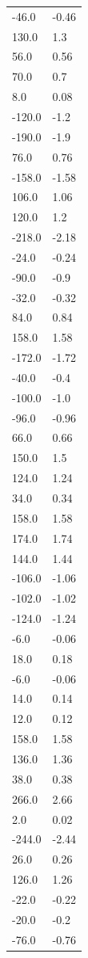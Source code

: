 \begin{longtable}{ll}
-46.0 & -0.46 \\
130.0 & 1.3 \\
56.0 & 0.56 \\
70.0 & 0.7 \\
8.0 & 0.08 \\
-120.0 & -1.2 \\
-190.0 & -1.9 \\
76.0 & 0.76 \\
-158.0 & -1.58 \\
106.0 & 1.06 \\
120.0 & 1.2 \\
-218.0 & -2.18 \\
-24.0 & -0.24 \\
-90.0 & -0.9 \\
-32.0 & -0.32 \\
84.0 & 0.84 \\
158.0 & 1.58 \\
-172.0 & -1.72 \\
-40.0 & -0.4 \\
-100.0 & -1.0 \\
-96.0 & -0.96 \\
66.0 & 0.66 \\
150.0 & 1.5 \\
124.0 & 1.24 \\
34.0 & 0.34 \\
158.0 & 1.58 \\
174.0 & 1.74 \\
144.0 & 1.44 \\
-106.0 & -1.06 \\
-102.0 & -1.02 \\
-124.0 & -1.24 \\
-6.0 & -0.06 \\
18.0 & 0.18 \\
-6.0 & -0.06 \\
14.0 & 0.14 \\
12.0 & 0.12 \\
158.0 & 1.58 \\
136.0 & 1.36 \\
38.0 & 0.38 \\
266.0 & 2.66 \\
2.0 & 0.02 \\
-244.0 & -2.44 \\
26.0 & 0.26 \\
126.0 & 1.26 \\
-22.0 & -0.22 \\
-20.0 & -0.2 \\
-76.0 & -0.76 \\

\end{longtable}
